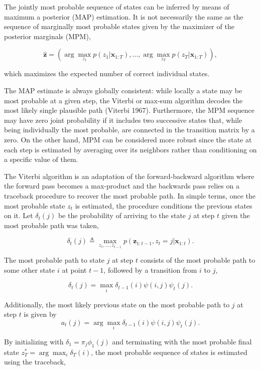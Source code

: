 \documentclass[]{article}
\newcommand{\argmax}{\arg\!\max}
\newcommand{\mat}[1]{\mathbf{#1}}
\begin{document}
The jointly most probable sequence of states can be inferred by means of
maximum a posterior (MAP) estimation. It is not necessarily the same as
the sequence of marginally most probable states given by the maximizer
of the posterior marginals (MPM),

\[
\mat{\hat{z}} = (\argmax_{z_1} p(z_1 | \mat{x}_{1:T}), \dots, \argmax_{z_T} p(z_T | \mat{x}_{1:T})),
\]

which maximizes the expected number of correct individual states.

The MAP estimate is always globally consistent: while locally a state
may be most probable at a given step, the Viterbi or max-sum algorithm
decodes the most likely single plausible path (Viterbi 1967).
Furthermore, the MPM sequence may have zero joint probability if it
includes two successive states that, while being individually the most
probable, are connected in the transition matrix by a zero. On the other
hand, MPM can be considered more robust since the state at each step is
estimated by averaging over its neighbors rather than conditioning on a
specific value of them.

The Viterbi algorithm is an adaptation of the forward-backward algorithm
where the forward pass becomes a max-product and the backwards pass
relies on a traceback procedure to recover the most probable path. In
simple terms, once the most probable state \(z_t\) is estimated, the
procedure conditions the previous states on it. Let \(\delta_t(j)\) be
the probability of arriving to the state \(j\) at step \(t\) given the
most probable path was taken,

\[
\delta_t(j)
  \triangleq \max_{z_1, \dots, z_{t-1}} p(\mat{z}_{1:t-1}, z_t = j | \mat{x}_{1:t}).
\]

The most probable path to state \(j\) at step \(t\) consists of the most
probable path to some other state \(i\) at point \(t-1\), followed by a
transition from \(i\) to \(j\),

\[
\delta_t(j)
  = \max_{i} \delta_{t-1}(i) \psi(i, j) \psi_t(j).
\]

Additionally, the most likely previous state on the most probable path
to \(j\) at step \(t\) is given by \[
a_t(j)
  = \argmax_{i} \delta_{t-1}(i) \psi(i, j) \psi_t(j).
\]

By initializing with \(\delta_1 = \pi_j \phi_1(j)\) and terminating with
the most probable final state \(z_T^* = \argmax_{i} \delta_T(i)\), the
most probable sequence of states is estimated using the traceback,
\end{document}
